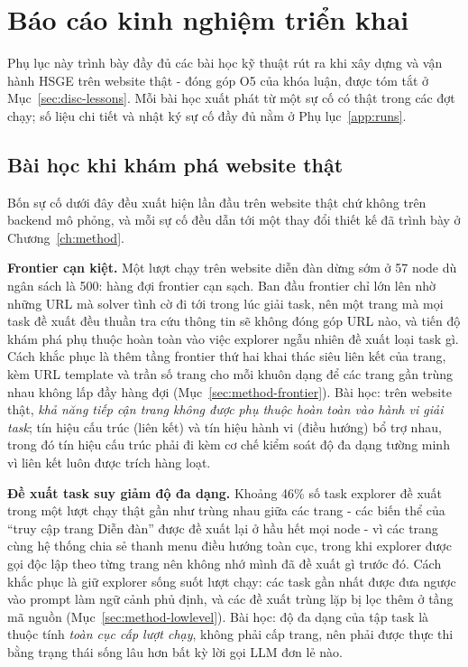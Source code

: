 \chapter{Báo cáo kinh nghiệm triển khai}
\label{app:lessons}

Phụ lục này trình bày đầy đủ các bài học kỹ thuật rút ra khi xây dựng và vận
hành HSGE trên website thật - đóng góp O5 của khóa luận, được tóm tắt ở
Mục~\ref{sec:disc-lessons}. Mỗi bài học xuất phát từ một sự cố có thật trong
các đợt chạy; số liệu chi tiết và nhật ký sự cố đầy đủ nằm ở
Phụ lục~\ref{app:runs}.

\section{Bài học khi khám phá website thật}
\label{sec:disc-exploration}

Bốn sự cố dưới đây đều xuất hiện lần đầu trên website thật chứ không trên
backend mô phỏng, và mỗi sự cố đều dẫn tới một thay đổi thiết kế đã trình bày ở
Chương~\ref{ch:method}.

\textbf{Frontier cạn kiệt.} Một lượt chạy trên website diễn đàn dừng sớm ở 57
node dù ngân sách là 500: hàng đợi frontier cạn sạch. Ban đầu frontier chỉ lớn
lên nhờ những URL mà solver tình cờ đi tới trong lúc giải task, nên một trang
mà mọi task đề xuất đều thuần tra cứu thông tin sẽ không đóng góp URL nào, và
tiến độ khám phá phụ thuộc hoàn toàn vào việc explorer ngẫu nhiên đề xuất loại
task gì. Cách khắc phục là thêm tầng frontier thứ hai khai thác siêu liên kết
của trang, kèm URL template và trần số trang cho mỗi khuôn dạng để các trang
gần trùng nhau không lấp đầy hàng đợi (Mục~\ref{sec:method-frontier}). Bài học:
trên website thật, \emph{khả năng tiếp cận trang không được phụ thuộc hoàn toàn
vào hành vi giải task}; tín hiệu cấu trúc (liên kết) và tín hiệu hành vi (điều
hướng) bổ trợ nhau, trong đó tín hiệu cấu trúc phải đi kèm cơ chế kiểm soát độ
đa dạng tường minh vì liên kết luôn được trích hàng loạt.

\textbf{Đề xuất task suy giảm độ đa dạng.} Khoảng 46\% số task explorer đề xuất
trong một lượt chạy thật gần như trùng nhau giữa các trang - các biến thể của
``truy cập trang Diễn đàn'' được đề xuất lại ở hầu hết mọi node - vì các trang
cùng hệ thống chia sẻ thanh menu điều hướng toàn cục, trong khi explorer được
gọi độc lập theo từng trang nên không nhớ mình đã đề xuất gì trước đó. Cách
khắc phục là giữ explorer sống suốt lượt chạy: các task gần nhất được đưa ngược
vào prompt làm ngữ cảnh phủ định, và các đề xuất trùng lặp bị lọc thêm ở tầng mã
nguồn (Mục~\ref{sec:method-lowlevel}). Bài học: độ đa dạng của tập task là
thuộc tính \emph{toàn cục cấp lượt chạy}, không phải cấp trang, nên phải được
thực thi bằng trạng thái sống lâu hơn bất kỳ lời gọi LLM đơn lẻ nào.

